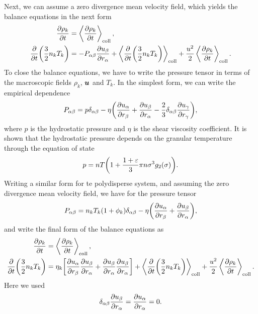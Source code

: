 \documentclass[aps,prl,preprint,groupedaddress,10pt]{revtex4-2}
\begin{document}
Next, we can assume a zero divergence mean velocity field, which yields the balance
equations in the next form
\begin{equation}
    \begin{split}
        \pdv{\rho_k}{t} &= \ltx{\avg{\pdv{\rho_k}{t}}}{coll},\\
        \pdv{t}\pqty{\frac{3}{2}n_kT_k} &= -\iab{P}\pdv{\ib{u}}{\ia{r}}+
        \ltx{\avg{\pdv{t}\pqty{\frac{3}{2}n_kT_k}}}{coll}+
        \frac{u^2}{2}\ltx{\avg{\pdv{\rho_k}{t}}}{coll}.
    \end{split}
\end{equation}
To close the balance equations, we have to write the pressure tensor in terms of the macroscopic
fields $\rho_k$, $\vb*{u}$ and $T_k$. In the simplest form, we can write the empirical dependence
\begin{equation}
    \iab{P} = p\iab{\delta}-\eta\pqty{\pdv{\ia{u}}{\ib{r}}+\pdv{\ib{u}}{\ia{r}}
        -\frac{2}{3}\iab{\delta}\pdv{\ig{u}}{\ig{r}}},
\end{equation}
where $p$ is the hydrostatic pressure and $\eta$ is the shear viscosity coefficient. It is shown
that the hydrostatic pressure depends on the granular temperature through the equation of state
\begin{equation}
    p = nT\pqty{1+\frac{1+\eps}{3}\pi n\sigma^{3}g_2\pqty{\sigma}}.
\end{equation}
Writing a similar form for te polydisperse system, and assuming the zero divergence mean velocity
field, we have for the pressure tensor
\begin{equation}
    \iab{P}=n_kT_k(1+\phi_k)\iab{\delta}-\eta\pqty{\pdv{\ia{u}}{\ib{r}}+\pdv{\ib{u}}{\ia{r}}},
\end{equation}
and write the final form of the balance equations as
\begin{equation}
    \begin{split}
        \pdv{\rho_k}{t} &= \ltx{\avg{\pdv{\rho_k}{t}}}{coll},\\
        \pdv{t}\pqty{\frac{3}{2}n_kT_k} &=
        \eta_k\bqty{\pdv{\ia{u}}{\ib{r}}\pdv{\ib{u}}{\ia{r}}+\pdv{\ib{u}}{\ia{r}}\pdv{\ib{u}}{\ia{r}}}+
        \ltx{\avg{\pdv{t}\pqty{\frac{3}{2}n_kT_k}}}{coll}+
        \frac{u^2}{2}\ltx{\avg{\pdv{\rho_k}{t}}}{coll}.
    \end{split}
\end{equation}
Here we used
\begin{equation}
    {\delta}_{\alpha\beta}\pdv{{u}_{\beta}}{{r}_{\alpha}}=\pdv{{u}_{\alpha}}{{r}_{\alpha}}=0.
\end{equation}
\end{document}
